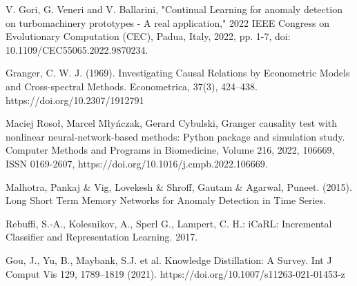 \documentclass[runningheads]{llncs}
\begin{document}
\begin{thebibliography}{18}
V. Gori, G. Veneri and V. Ballarini, "Continual Learning for anomaly detection on turbomachinery prototypes - A real application," 2022 IEEE Congress on Evolutionary Computation (CEC), Padua, Italy, 2022, pp. 1-7, doi: 10.1109/CEC55065.2022.9870234.

Granger, C. W. J. (1969). Investigating Causal Relations by Econometric Models and Cross-spectral Methods. Econometrica, 37(3), 424–438. https://doi.org/10.2307/1912791

Maciej Rosoł, Marcel Młyńczak, Gerard Cybulski, Granger causality test with nonlinear neural-network-based methods: Python package and simulation study. Computer Methods and Programs in Biomedicine, Volume 216, 2022, 106669, ISSN 0169-2607, https://doi.org/10.1016/j.cmpb.2022.106669.

Malhotra, Pankaj \& Vig, Lovekesh \& Shroff, Gautam \& Agarwal, Puneet. (2015). Long Short Term Memory Networks for Anomaly Detection in Time Series. 

Rebuffi, S.-A., Kolesnikov, A., Sperl G., Lampert, C. H.: iCaRL: Incremental Classifier and Representation Learning. 2017.

Gou, J., Yu, B., Maybank, S.J. et al. Knowledge Distillation: A Survey. Int J Comput Vis 129, 1789–1819 (2021). https://doi.org/10.1007/s11263-021-01453-z







\end{thebibliography}
\end{document}
